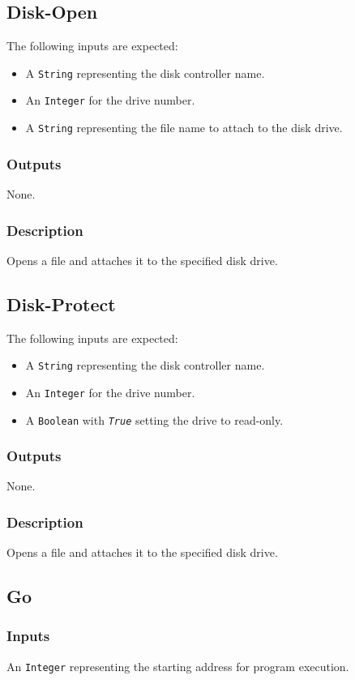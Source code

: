 \documentclass[10pt, openany]{book}
\newcommand{\constant}[1]{\emph{\texttt{#1}}}
\newcommand{\datatype}[1]{\texttt{#1}}
\begin{document}
\subsection{Disk-Open}
The following inputs are expected:
\begin{itemize}
  \item A \datatype{String} representing the disk controller name.
  \item An \datatype{Integer} for the drive number.
  \item A \datatype{String} representing the file name to attach to the disk drive.
\end{itemize}
\subsubsection{Outputs}
None.
\subsubsection{Description}
Opens a file and attaches it to the specified disk drive.

\subsection{Disk-Protect}
The following inputs are expected:
\begin{itemize}
  \item A \datatype{String} representing the disk controller name.
  \item An \datatype{Integer} for the drive number.
  \item A \datatype{Boolean} with \constant{True} setting the drive to read-only.
\end{itemize}
\subsubsection{Outputs}
None.
\subsubsection{Description}
Opens a file and attaches it to the specified disk drive.

\subsection{Go}
\subsubsection{Inputs}
An \datatype{Integer} representing the starting address for program execution.
\end{document}
